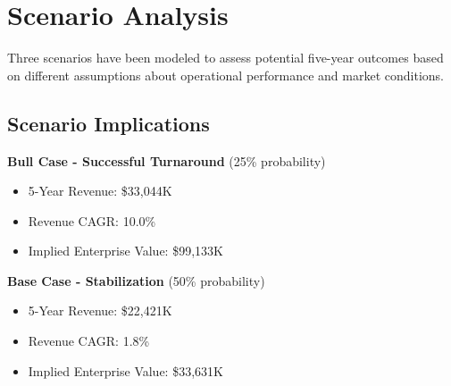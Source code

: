 \documentclass[11pt,a4paper]{article}
\begin{document}
\newpage

\section{Scenario Analysis}

Three scenarios have been modeled to assess potential five-year outcomes based on different assumptions about operational performance and market conditions.

\vspace{0.3cm}


\begin{table}[H]
\centering
\caption{Investment Scenarios - Bull/Base/Bear Analysis}
\label{tab:scenarios}
\end{table}

\vspace{0.3cm}

\subsection{Scenario Implications}

\textbf{Bull Case - Successful Turnaround} (25\% probability)

\begin{itemize}
\itemsep0.2em
\item 5-Year Revenue: \$33,044K
\item Revenue CAGR: 10.0\%
\item Implied Enterprise Value: \$99,133K
\end{itemize}

\vspace{0.2cm}

\textbf{Base Case - Stabilization} (50\% probability)

\begin{itemize}
\itemsep0.2em
\item 5-Year Revenue: \$22,421K
\item Revenue CAGR: 1.8\%
\item Implied Enterprise Value: \$33,631K
\end{itemize}
\end{document}
